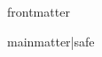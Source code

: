 \documentclass[10pt,twoside]{book}
\begin{document}
    \frontmatter
    {{ frontmatter }}

    \mainmatter
    \pagestyle{fancy}
    {{ mainmatter|safe }}
\end{document}
